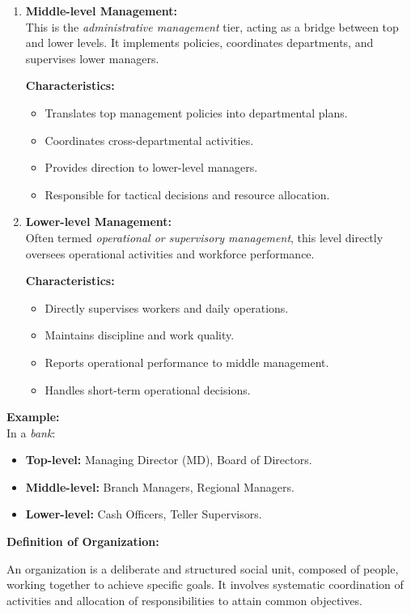\documentclass[10pt,a4paper]{book}
\begin{document}
\begin{multicols}{2}
\begin{enumerate}
    \item \textbf{Middle-level Management:}\\
    This is the \textit{administrative management} tier, acting as a bridge between top and lower levels. It implements policies, coordinates departments, and supervises lower managers.

    \textbf{Characteristics:}
    \begin{itemize}
        \item Translates top management policies into departmental plans.
        \item Coordinates cross-departmental activities.
        \item Provides direction to lower-level managers.
        \item Responsible for tactical decisions and resource allocation.
    \end{itemize}

    \item \textbf{Lower-level Management:}\\
    Often termed \textit{operational or supervisory management}, this level directly oversees operational activities and workforce performance.

    \textbf{Characteristics:}
    \begin{itemize}
        \item Directly supervises workers and daily operations.
        \item Maintains discipline and work quality.
        \item Reports operational performance to middle management.
        \item Handles short-term operational decisions.
    \end{itemize}
\end{enumerate}

\textbf{Example:}\\
In a \textit{bank}:
\begin{itemize}
    \item \textbf{Top-level:} Managing Director (MD), Board of Directors.
    \item \textbf{Middle-level:} Branch Managers, Regional Managers.
    \item \textbf{Lower-level:} Cash Officers, Teller Supervisors.
\end{itemize}


\textbf{Definition of Organization:}

An organization is a deliberate and structured social unit, composed of people, working together to achieve specific goals. It involves systematic coordination of activities and allocation of responsibilities to attain common objectives.


\end{multicols}
\end{document}
